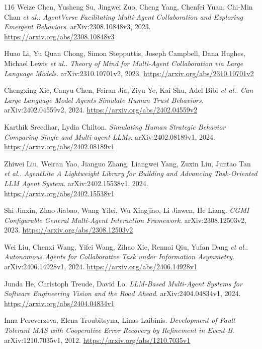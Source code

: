 \documentclass[11pt,a4paper]{article}
\begin{document}
\begin{thebibliography}{116}
Weize Chen, Yusheng Su, Jingwei Zuo, Cheng Yang, Chenfei Yuan, Chi-Min Chan \emph{et al.}.
\newblock \emph{AgentVerse Facilitating Multi-Agent Collaboration and Exploring Emergent Behaviors}.
\newblock arXiv:2308.10848v3, 2023.
\newblock \url{https://arxiv.org/abs/2308.10848v3}

Huao Li, Yu Quan Chong, Simon Stepputtis, Joseph Campbell, Dana Hughes, Michael Lewis \emph{et al.}.
\newblock \emph{Theory of Mind for Multi-Agent Collaboration via Large Language Models}.
\newblock arXiv:2310.10701v2, 2023.
\newblock \url{https://arxiv.org/abs/2310.10701v2}

Chengxing Xie, Canyu Chen, Feiran Jia, Ziyu Ye, Kai Shu, Adel Bibi \emph{et al.}.
\newblock \emph{Can Large Language Model Agents Simulate Human Trust Behaviors}.
\newblock arXiv:2402.04559v2, 2024.
\newblock \url{https://arxiv.org/abs/2402.04559v2}

Karthik Sreedhar, Lydia Chilton.
\newblock \emph{Simulating Human Strategic Behavior Comparing Single and Multi-agent LLMs}.
\newblock arXiv:2402.08189v1, 2024.
\newblock \url{https://arxiv.org/abs/2402.08189v1}

Zhiwei Liu, Weiran Yao, Jianguo Zhang, Liangwei Yang, Zuxin Liu, Juntao Tan \emph{et al.}.
\newblock \emph{AgentLite A Lightweight Library for Building and Advancing Task-Oriented LLM Agent System}.
\newblock arXiv:2402.15538v1, 2024.
\newblock \url{https://arxiv.org/abs/2402.15538v1}

Shi Jinxin, Zhao Jiabao, Wang Yilei, Wu Xingjiao, Li Jiawen, He Liang.
\newblock \emph{CGMI Configurable General Multi-Agent Interaction Framework}.
\newblock arXiv:2308.12503v2, 2023.
\newblock \url{https://arxiv.org/abs/2308.12503v2}

Wei Liu, Chenxi Wang, Yifei Wang, Zihao Xie, Rennai Qiu, Yufan Dang \emph{et al.}.
\newblock \emph{Autonomous Agents for Collaborative Task under Information Asymmetry}.
\newblock arXiv:2406.14928v1, 2024.
\newblock \url{https://arxiv.org/abs/2406.14928v1}

Junda He, Christoph Treude, David Lo.
\newblock \emph{LLM-Based Multi-Agent Systems for Software Engineering Vision and the Road Ahead}.
\newblock arXiv:2404.04834v1, 2024.
\newblock \url{https://arxiv.org/abs/2404.04834v1}

Inna Pereverzeva, Elena Troubitsyna, Linas Laibinis.
\newblock \emph{Development of Fault Tolerant MAS with Cooperative Error Recovery by Refinement in Event-B}.
\newblock arXiv:1210.7035v1, 2012.
\newblock \url{https://arxiv.org/abs/1210.7035v1}


\end{thebibliography}
\end{document}
